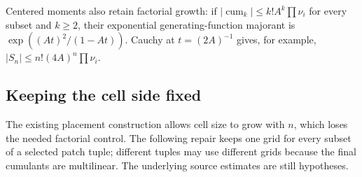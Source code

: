 \documentclass[11pt]{article}
\theoremstyle{remark}
\newcommand{\cum}{\operatorname{cum}}
\begin{document}
Centered moments also retain factorial growth: if
$|\cum_k|\leq k!A^k\prod\nu_i$ for every subset and $k\geq2$,
their exponential generating-function majorant is
$\exp((At)^2/(1-At))$. Cauchy at $t=(2A)^{-1}$ gives, for example,
$|S_n|\leq n!(4A)^n\prod\nu_i$.

\subsection{Keeping the cell side fixed}

The existing placement construction allows cell size to grow with $n$,
which loses the needed factorial control. The following repair keeps
one grid for every subset of a selected patch tuple; different tuples
may use different grids because the final cumulants are multilinear.
The underlying source estimates are still hypotheses.
\end{document}
